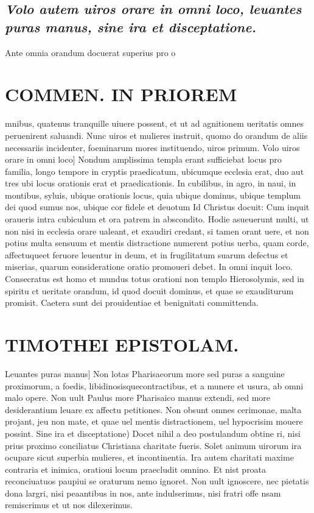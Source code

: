 \documentclass{article}
\begin{document}
\begin{pages}
\subsection*{\textit{Volo autem uiros orare in omni loco, leuantes puras manus, sine ira et disceptatione. }}\pstart Ante omnia orandum docuerat superius pro o\pend
\section*{COMMEN. IN PRIOREM }
\marginpar{[ p.54 ]}\pstart mnibus, quatenus tranquille uiuere possent, et ut ad agnitionem ueritatis omnes peruenirent saluandi. Nunc uiros et mulieres instruit, quomo do orandum de aliis necessariis incidenter, foeminarum mores instituendo, uiros primum.  \pend\pstart Volo uiros orare in omni loco] Nondum amplissima templa erant sufficiebat locus pro familia, longo tempore in cryptis praedicatum, ubicumque  ecclesia erat, duo aut tres ubi locus orationis erat et praedicationis. In cubilibus, in agro, in naui, in montibus, syluis, ubique  orationis locus, quia ubique  dominus, ubique  templum dei quod sumus nos, ubique  cor fidele et deuotum Id Christus docuit: Cum inquit oraueris intra cubiculum et ora patrem in abscondito. Hodie asueuerunt multi, ut non nisi in ecclesia orare ualeant, et exaudiri credant, si tamen orant uere, et non potius multa sensuum et mentis distractione numerent potius uerba, quam corde, affectuqueet feruore leuentur in deum, et in frugilitatum suarum defectus et miserias, quarum eonsideratione oratio promoueri debet. In omni inquit loco. Consecratus est homo et mundus totus orationi non templo Hierosolymis, sed in spiritu ct ueritate orandum, id quod docuit dominus, et quae se exauditurum promisit. Caetera sunt dei prouidentiae et benignitati committenda.  \pend
\section*{TIMOTHEI EPISTOLAM. }
\marginpar{[ p.55 ]}\pstart Leuantes puras manus] Non lotas Pharisaeorum more sed puras a sanguine proximorum, a foedis, libidinosisquecontractibus, et a munere et usura, ab omni malo opere. Non uult Paulus more Pharisaico manus extendi, sed more desiderantium leuare ex affectu petitiones. Non obsunt omnes cerimonae, malta projant, jeu non mate, et quae uel mentis distractionem, uel hypocrisim mouere possint.  \pend\pstart Sine ira et disceptatione) Docet nihil a deo postulandum obtine ri, nisi prius proximo conciliatus Christiana charitate fueris. Solet animum uirorum ira ocupare sicut superbia mulieres, et incontinentia. Ira autem charitati maxime contraria et inimica, oratioui locum praecludit omnino. Et nist proata reconciuatuos paupiui se oraturum nemo ignoret. Non uult ignoscere, nec pietatis dona largri, nisi peaantibus in nos, ante indulserimus, nisi fratri offe nsam remiscrimus et ut nos dilexerimus.  \pend
{}
{}

\end{pages}
\end{document}

